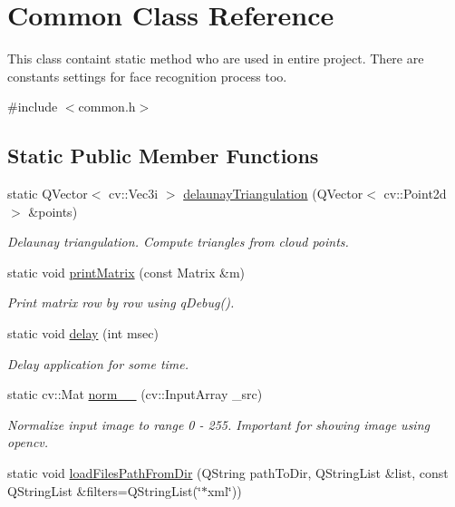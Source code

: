 \hypertarget{class_common}{\section{Common Class Reference}
\label{class_common}
}


This class containt static method who are used in entire project. There are constants settings for face recognition process too.  




{\ttfamily \#include $<$common.\+h$>$}

\subsection*{Static Public Member Functions}
\begin{DoxyCompactItemize}
\item 
static Q\+Vector$<$ cv\+::\+Vec3i $>$ \hyperlink{class_common_aa62fca6495c60bbf8a4f621fbe163371}{delaunay\+Triangulation} (Q\+Vector$<$ cv\+::\+Point2d $>$ \&points)
\begin{DoxyCompactList}\small\item\em Delaunay triangulation. Compute triangles from cloud points. \end{DoxyCompactList}\item 
static void \hyperlink{class_common_ab7b94808d6510e9772663360ad40907b}{print\+Matrix} (const Matrix \&m)
\begin{DoxyCompactList}\small\item\em Print matrix row by row using q\+Debug(). \end{DoxyCompactList}\item 
static void \hyperlink{class_common_acecc1d26e7275d493ca296328faacad8}{delay} (int msec)
\begin{DoxyCompactList}\small\item\em Delay application for some time. \end{DoxyCompactList}\item 
static cv\+::\+Mat \hyperlink{class_common_a09e3bdf2b3e4fc337a439a5028d648d2}{norm\+\_\+\_} (cv\+::\+Input\+Array \+\_\+src)
\begin{DoxyCompactList}\small\item\em Normalize input image to range 0 -\/ 255. Important for showing image using opencv. \end{DoxyCompactList}\item 
static void \hyperlink{class_common_aca3ae19fd0b26aca24a4fde7d503df37}{load\+Files\+Path\+From\+Dir} (Q\+String path\+To\+Dir, Q\+String\+List \&list, const Q\+String\+List \&filters=Q\+String\+List(\char`\"{}$\ast$xml\char`\"{}))

\end{DoxyCompactItemize}

